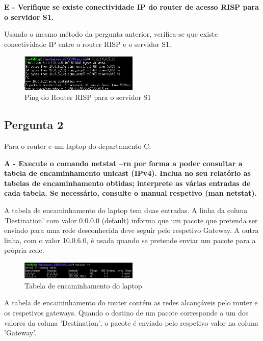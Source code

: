 \documentclass[11pt]{article}
\begin{document}
\clearpage

\textbf{E - Verifique se existe conectividade IP do router de acesso RISP para o servidor S1.}

Usando o mesmo método da pergunta anterior, verifica-se que existe conectividade IP entre o router RISP e o servidor S1.

\begin{figure}[!htb]
    \centering
    \includegraphics[width=0.5\textwidth]{images/parte2/Risp.png}
    \caption{Ping do Router RISP para o servidor S1}
\end{figure}

\vspace{0.5cm}

\subsection{Pergunta 2}

Para o router e um laptop do departamento C:

\vspace{0.5cm}

\textbf{A - Execute o comando netstat –rn por forma a poder consultar a tabela de encaminhamento unicast (IPv4). Inclua no seu relatório as tabelas de encaminhamento obtidas; interprete as várias entradas de cada tabela. Se necessário, consulte o manual respetivo (man netstat).}

A tabela de encaminhamento do laptop tem duas entradas. A linha da coluna 'Destination' com valor 0.0.0.0 (default) informa que um pacote que pretenda ser enviado para uma rede desconhecida deve seguir pelo respetivo Gateway. A outra linha, com o valor 10.0.6.0, é usada quando se pretende enviar um pacote para a própria rede.

\begin{figure}[!htb]
    \centering
    \includegraphics[width=0.5\textwidth]{images/parte2/laptopC.png}
    \caption{Tabela de encaminhamento do laptop}
\end{figure}

\clearpage
A tabela de encaminhamento do router contém as redes alcançáveis pelo router e os respetivos gateways.
Quando o destino de um pacote corresponde a um dos valores da coluna 'Destination', o pacote é enviado pelo respetivo valor na coluna 'Gateway'.
\end{document}

